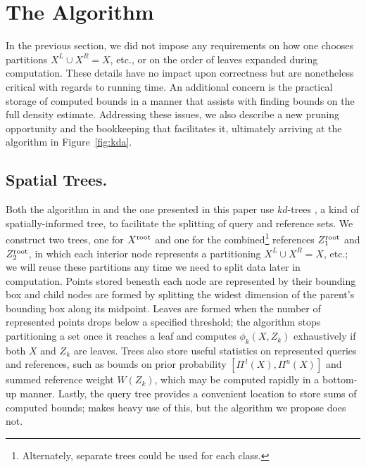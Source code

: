 \documentclass[twoside,leqno,twocolumn]{article}
\newcommand{\kdroot}[1]{#1^{\rm root}}
\newcommand{\kdleft}[1]{#1^{\!L}}
\newcommand{\kdright}[1]{#1^{\!R}}
\newcommand{\lo}[1]{#1^{\,l}}
\newcommand{\hi}[1]{#1^u}
\begin{document}
\section{The Algorithm}\label{sec:alg}
In the previous section, we did not impose any requirements on how one
chooses partitions $\kdleft{X} \cup \kdright{X} = X$, etc., or on the
order of leaves expanded during computation.  These details have no
impact upon correctness but are nonetheless critical with regards to
running time.  An additional concern is the practical storage of
computed bounds in a manner that assists with finding bounds on the
full density estimate.  Addressing these issues, we also describe a
new pruning opportunity and the bookkeeping that facilitates it,
ultimately arriving at the algorithm in Figure~\ref{fig:kda}.

\subsection{Spatial Trees.}

Both the algorithm in \cite{nbc-compstat} and the one presented in
this paper use $kd$-trees \cite{preparata}, a kind of
spatially-informed tree, to facilitate the splitting of query and
reference sets.  We construct two trees, one for $\kdroot{X}$ and one
for the combined\footnote{Alternately, separate trees could be used
for each class.} references $\kdroot{Z_1}$ and $\kdroot{Z_2}$, in
which each interior node represents a partitioning $\kdleft{X} \cup
\kdright{X} = X$, etc.; we will reuse these partitions any time we
need to split data later in computation.  Points stored beneath each
node are represented by their bounding box and child nodes are formed
by splitting the widest dimension of the parent's bounding box along
its midpoint.
Leaves are formed when the number of represented points drops below a
specified threshold; the algorithm stops partitioning a set once it
reaches a leaf and computes $\phi_k(X,Z_k)$ exhaustively if both $X$
and $Z_k$ are leaves.  Trees also store useful statistics on
represented queries and references, such as bounds on prior
probability $\left[ \lo{\Pi}(X), \hi{\Pi}(X) \right]$ and summed
reference weight $W(Z_k)$, which may be computed rapidly in a
bottom-up manner.  Lastly, the query tree provides a convenient
location to store sums of computed bounds; \cite{nbc-compstat} makes
heavy use of this, but the algorithm we propose does not.
\end{document}
